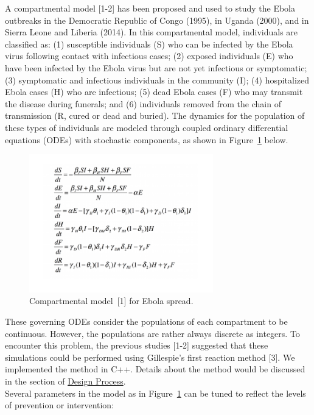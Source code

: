\documentclass[11pt,letter]{article}
\begin{document}
A compartmental model [1-2] has been proposed and used to study the Ebola outbreaks in the Democratic Republic of Congo (1995), in Uganda (2000), and in Sierra Leone and Liberia (2014). In this compartmental model, individuals are classified as: (1) susceptible individuals (S) who can be infected by the Ebola virus following contact with infectious cases; (2) exposed individuals (E) who have been infected by the Ebola virus but are not yet infectious or symptomatic; (3) symptomatic and infectious individuals in the community (I); (4) hospitalized Ebola cases (H) who are infectious; (5) dead Ebola cases (F) who may transmit the disease during funerals; and (6) individuals removed from the chain of transmission (R, cured or dead and buried). The dynamics for the population of these types of individuals are modeled through coupled ordinary differential equations (ODEs) with stochastic components, as shown in Figure~\ref{cmodel} below.\\

\begin{figure}[t]
\centering
\includegraphics[width=8cm]{cmodel.pdf}
\caption{Compartmental model~[1] for Ebola spread.
\label{cmodel}}
\end{figure}


These governing ODEs consider the populations of each compartment to be continuous. However, the populations are rather always discrete as integers. To encounter this problem, the previous studies [1-2] suggested that these simulations could be performed using Gillespie's first reaction method [3]. We implemented the method in C++. Details about the method would be discussed in the section of \underline{Design Process}. \\


Several parameters in the model as in Figure~\ref{cmodel} can be tuned to reflect the levels of prevention or intervention:%
\end{document}
